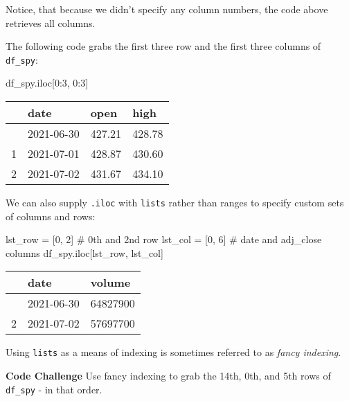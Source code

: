 \documentclass[
  letterpaper,
  DIV=11,
  numbers=noendperiod]{scrreprt}
\newenvironment{Shaded}{\begin{snugshade}}{\end{snugshade}}
\newcommand{\CommentTok}[1]{\textcolor[rgb]{0.37,0.37,0.37}{#1}}
\newcommand{\DecValTok}[1]{\textcolor[rgb]{0.68,0.00,0.00}{#1}}
\newcommand{\NormalTok}[1]{\textcolor[rgb]{0.00,0.23,0.31}{#1}}
\newcommand{\OperatorTok}[1]{\textcolor[rgb]{0.37,0.37,0.37}{#1}}
\begin{document}
Notice, that because we didn't specify any column numbers, the code
above retrieves all columns.

The following code grabs the first three row and the first three columns
of \texttt{df\_spy}:

\begin{Shaded}
\begin{Highlighting}[]
\NormalTok{df\_spy.iloc[}\DecValTok{0}\NormalTok{:}\DecValTok{3}\NormalTok{, }\DecValTok{0}\NormalTok{:}\DecValTok{3}\NormalTok{]}
\end{Highlighting}
\end{Shaded}

\begin{longtable}[]{@{}llll@{}}
\toprule\noalign{}
& date & open & high \\
\midrule\noalign{}
\endhead
\bottomrule\noalign{}
\endlastfoot
0 & 2021-06-30 & 427.21 & 428.78 \\
1 & 2021-07-01 & 428.87 & 430.60 \\
2 & 2021-07-02 & 431.67 & 434.10 \\
\end{longtable}

We can also supply \texttt{.iloc} with \texttt{lists} rather than ranges
to specify custom sets of columns and rows:

\begin{Shaded}
\begin{Highlighting}[]
\NormalTok{lst\_row }\OperatorTok{=}\NormalTok{ [}\DecValTok{0}\NormalTok{, }\DecValTok{2}\NormalTok{] }\CommentTok{\# 0th and 2nd row}
\NormalTok{lst\_col }\OperatorTok{=}\NormalTok{ [}\DecValTok{0}\NormalTok{, }\DecValTok{6}\NormalTok{] }\CommentTok{\# date and adj\_close columns}
\NormalTok{df\_spy.iloc[lst\_row, lst\_col]}
\end{Highlighting}
\end{Shaded}

\begin{longtable}[]{@{}lll@{}}
\toprule\noalign{}
& date & volume \\
\midrule\noalign{}
\endhead
\bottomrule\noalign{}
\endlastfoot
0 & 2021-06-30 & 64827900 \\
2 & 2021-07-02 & 57697700 \\
\end{longtable}

Using \texttt{lists} as a means of indexing is sometimes referred to as
\emph{fancy indexing}.

\textbf{Code Challenge} Use fancy indexing to grab the 14th, 0th, and
5th rows of \texttt{df\_spy} - in that order.
\end{document}
